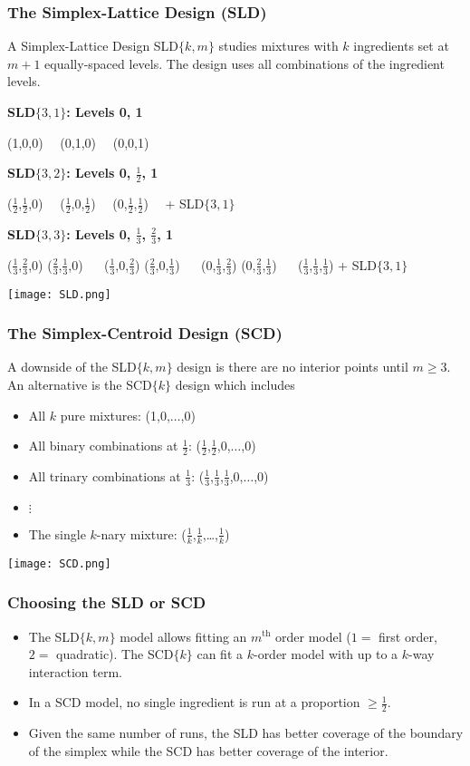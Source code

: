 \documentclass{beamer}
\newcommand\half{${\textstyle \frac12}$}
\newcommand\third{${\textstyle \frac13}$}
\newcommand\twothird{${\textstyle \frac23}$}
\newcommand\tq{$\quad$}
\begin{document}
\begin{frame}
\frametitle{The Simplex-Lattice Design (SLD)}

A Simplex-Lattice Design SLD$\{k,m\}$ studies mixtures with $k$ ingredients set at $m+1$ equally-spaced levels. The design uses all combinations of the ingredient levels.

\small
\medskip
\pause
\textbf{SLD$\{3,1\}$: Levels 0, 1}
\begin{center}(1,0,0) \tq (0,1,0) \tq (0,0,1)\end{center}

\medskip
\pause
\textbf{SLD$\{3,2\}$: Levels 0, \half, 1}
\begin{center}
(\half,\half,0) \tq (\half,0,\half) \tq (0,\half,\half) \tq + SLD$\{3,1\}$
\end{center}

\medskip
\pause
\textbf{SLD$\{3,3\}$: Levels 0, \third, \twothird, 1}
\begin{center}
(\third,\twothird,0) (\twothird,\third,0) \tq
(\third,0,\twothird) (\twothird,0,\third) \tq
(0,\third,\twothird) (0,\twothird,\third) \tq
(\third,\third,\third)  + SLD$\{3,1\}$
\end{center}
\normalsize

\pause
\medskip
\texttt{[image: SLD.png]}
\end{frame}

\begin{frame}
\frametitle{The Simplex-Centroid Design (SCD)}

A downside of the SLD$\{k,m\}$ design is there are no interior points until $m\ge3$. An alternative is the SCD$\{k\}$ design which includes
\begin{itemize}
	\item All $k$ pure mixtures: (1,0,$\ldots$,0)
	\item All binary combinations at \half: (\half,\half,0,$\ldots$,0)
	\item All trinary combinations at \third: (\third,\third,\third,0,$\ldots$,0)
	\item $\vdots$
	\item The single $k$-nary mixture: ($\frac1k$,$\frac1k$,\ldots,$\frac1k$)
\end{itemize}

\pause
\medskip
\texttt{[image: SCD.png]}
\end{frame}

\begin{frame}
\frametitle{Choosing the SLD or SCD}

\begin{itemize}
	\item The SLD$\{k,m\}$ model allows fitting an $m^\text{th}$ order model ($1=$ first order, $2=$ quadratic). The SCD$\{k\}$ can fit a $k$-order model with up to a $k$-way interaction term.
	\item In a SCD model, no single ingredient is run at a proportion $\ge$\half.
	\item Given the same number of runs, the SLD has better coverage of the boundary of the simplex while the SCD has better coverage of the interior.
\end{itemize}	
\end{frame}
\end{document}
